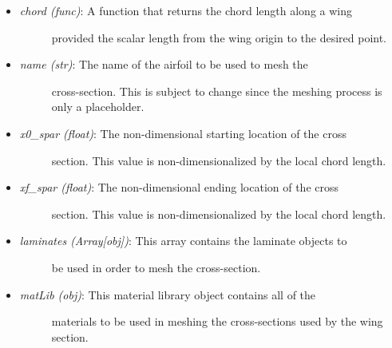 \documentclass[letterpaper,10pt,english]{sphinxmanual}
\begin{document}
\begin{fulllineitems}
\begin{fulllineitems}
\begin{itemize}
\item {} \begin{description}
\item[{\emph{chord (func)}: A function that returns the chord length along a wing}] \leavevmode
provided the scalar length from the wing origin to the desired
point.

\end{description}

\item {} \begin{description}
\item[{\emph{name (str)}: The name of the airfoil to be used to mesh the}] \leavevmode
cross-section. This is subject to change since the meshing process
is only a placeholder.

\end{description}

\item {} \begin{description}
\item[{\emph{x0\_spar (float)}: The non-dimensional starting location of the cross}] \leavevmode
section. This value is non-dimensionalized by the local chord
length.

\end{description}

\item {} \begin{description}
\item[{\emph{xf\_spar (float)}: The non-dimensional ending location of the cross}] \leavevmode
section. This value is non-dimensionalized by the local chord
length.

\end{description}

\item {} \begin{description}
\item[{\emph{laminates (Array{[}obj{]})}: This array contains the laminate objects to}] \leavevmode
be used in order to mesh the cross-section.

\end{description}

\item {} \begin{description}
\item[{\emph{matLib (obj)}: This material library object contains all of the}] \leavevmode
materials to be used in meshing the cross-sections used by the
wing section.


\end{description}
\end{itemize}
\end{fulllineitems}
\end{fulllineitems}
\end{document}
